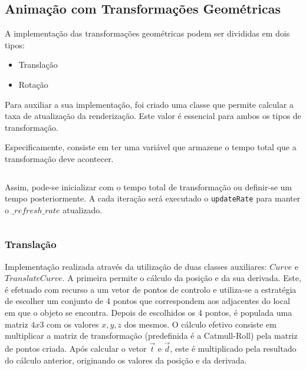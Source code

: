 \documentclass[relatorio.tex]{subfiles}
\begin{document}
\subsection{Animação com Transformações Geométricas}
A implementação das transformações geométricas podem ser divididas em dois tipos:
\begin{itemize}
    \item Translação
    \item Rotação
\end{itemize}
Para auxiliar a sua implementação, foi criado uma classe que permite calcular 
a taxa de atualização da renderização.
Este valor é essencial para ambos os tipos de transformação.

Especificamente, consiste em ter uma variável que armazene o tempo total que 
a transformação deve acontecer.
\begin{code}
\label{code:time_control}
\inputminted[firstline=6, lastline=15]{cpp}{../../TimeControl.h}
\end{code}

Assim, pode-se inicializar com o tempo total de transformação ou
definir-se um tempo posteriormente.
A cada iteração será executado o \texttt{updateRate}
para manter o $\_refresh\_rate$ atualizado.

\begin{code}
\label{code:update_rate}
\inputminted[firstline=22, lastline=25]{cpp}{../../TimeControl.cpp}
\end{code}


\subsubsection{Translação} \label{subsub:transl}
Implementação realizada através da utilização de duas classes auxiliares:
$Curve$ e $TranslateCurve$.
A primeira permite o cálculo da posição e da sua derivada.
Este, é efetuado com recurso a um vetor de pontos de controlo
e utiliza-se a estratégia de escolher um conjunto de 4 pontos
que correspondem aos adjacentes do local em que o objeto se encontra.
Depois de escolhidos os 4 pontos, é populada uma matriz $4x3$ com os valores 
$x,y,z$ dos mesmos.
O cálculo efetivo consiste em multiplicar a matriz de transformação
(predefinida é a Catmull-Roll) pela matriz de pontos criada.
Após calcular o vetor $\overrightarrow{t}$ e $\overrightarrow{d}$,
este é multiplicado pela resultado do cálculo anterior,
originando os valores da posição e da derivada.
\end{document}

